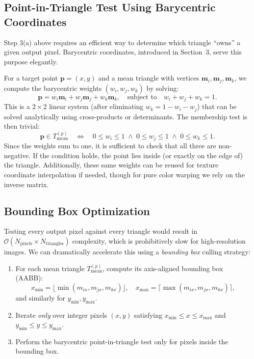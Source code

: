 \subsection{Point-in-Triangle Test Using Barycentric Coordinates}

Step 3(a) above requires an efficient way to determine which triangle ``owns'' a given output pixel. Barycentric coordinates, introduced in Section~3, serve this purpose elegantly.

For a target point $\mathbf{p} = (x, y)$ and a mean triangle with vertices $\mathbf{m}_i, \mathbf{m}_j, \mathbf{m}_k$, we compute the barycentric weights $(w_i, w_j, w_k)$ by solving:
\begin{equation}
    \mathbf{p} = w_i \mathbf{m}_i + w_j \mathbf{m}_j + w_k \mathbf{m}_k,
    \quad \text{subject to} \quad w_i + w_j + w_k = 1.
\end{equation}
This is a $2 \times 2$ linear system (after eliminating $w_k = 1 - w_i - w_j$) that can be solved analytically using cross-products or determinants. The membership test is then trivial:
\begin{equation}
    \mathbf{p} \in T_{\text{mean}}^{(p)} \quad \Longleftrightarrow \quad
    0 \leq w_i \leq 1 \;\land\; 0 \leq w_j \leq 1 \;\land\; 0 \leq w_k \leq 1.
\end{equation}
Since the weights sum to one, it is sufficient to check that all three are non-negative. If the condition holds, the point lies inside (or exactly on the edge of) the triangle. Additionally, these same weights can be reused for texture coordinate interpolation if needed, though for pure color warping we rely on the inverse matrix.

\subsection{Bounding Box Optimization}

Testing every output pixel against every triangle would result in $\mathcal{O}(N_{\text{pixels}} \times N_{\text{triangles}})$ complexity, which is prohibitively slow for high-resolution images. We can dramatically accelerate this using a \emph{bounding box} culling strategy:

\begin{enumerate}
    \item For each mean triangle $T_{\text{mean}}^{(p)}$, compute its axis-aligned bounding box (AABB):
    \[
        x_{\min} = \lfloor \min(m_{ix}, m_{jx}, m_{kx}) \rfloor, \quad
        x_{\max} = \lceil \max(m_{ix}, m_{jx}, m_{kx}) \rceil,
    \]
    and similarly for $y_{\min}, y_{\max}$.
    \item Iterate \emph{only} over integer pixels $(x, y)$ satisfying $x_{\min} \leq x \leq x_{\max}$ and $y_{\min} \leq y \leq y_{\max}$.
    \item Perform the barycentric point-in-triangle test only for pixels inside the bounding box.
\end{enumerate}

